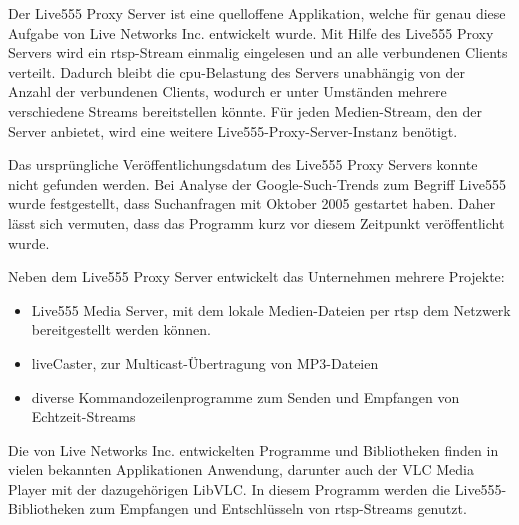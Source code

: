 Der Live555 Proxy Server ist eine quelloffene Applikation, welche für genau diese Aufgabe von Live Networks Inc. entwickelt wurde.
Mit Hilfe des Live555 Proxy Servers wird ein \acs{rtsp}-Stream einmalig eingelesen und an alle verbundenen Clients verteilt.
Dadurch bleibt die \acs{cpu}-Belastung des Servers unabhängig von der Anzahl der verbundenen Clients, wodurch er unter Umständen mehrere verschiedene Streams bereitstellen könnte. Für jeden Medien-Stream, den der Server anbietet, wird eine weitere Live555-Proxy-Server-Instanz benötigt.\par

Das ursprüngliche Veröffentlichungsdatum des Live555 Proxy Servers konnte nicht gefunden werden.
Bei Analyse der Google-Such-Trends zum Begriff Live555 wurde festgestellt, dass Suchanfragen mit Oktober 2005 gestartet haben.
Daher lässt sich vermuten, dass das Programm kurz vor diesem Zeitpunkt veröffentlicht wurde. \cite[vgl.][Interest over time]{live555-trends}

Neben dem Live555 Proxy Server entwickelt das Unternehmen mehrere Projekte:
\begin{itemize}
    \item Live555 Media Server, mit dem lokale Medien-Dateien per \acs{rtsp} dem Netzwerk bereitgestellt werden können.
    \item liveCaster, zur Multicast-Übertragung von MP3-Dateien
    \item diverse Kommandozeilenprogramme zum Senden und Empfangen von Echtzeit-Streams
\end{itemize}
Die von Live Networks Inc. entwickelten Programme und Bibliotheken finden in vielen bekannten Applikationen Anwendung, darunter auch der VLC Media Player mit der dazugehörigen LibVLC. In diesem Programm werden die Live555-Bibliotheken zum Empfangen und Entschlüsseln von \acs{rtsp}-Streams genutzt.